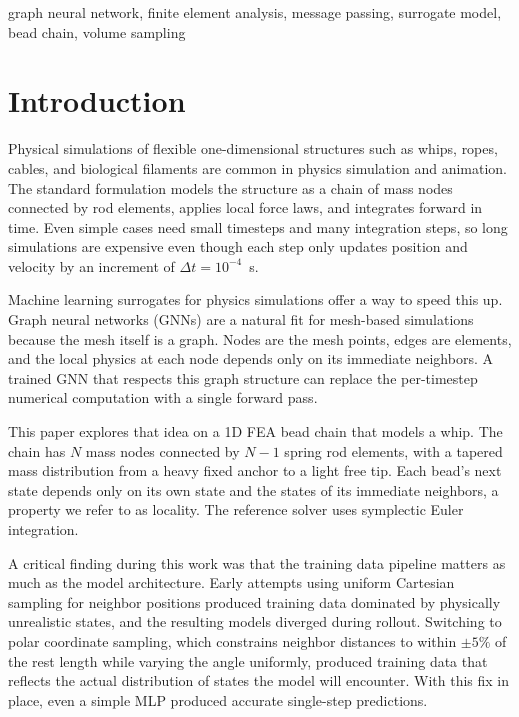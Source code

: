 \documentclass[conference]{IEEEtran}
\begin{document}
\begin{IEEEkeywords}
graph neural network, finite element analysis, message passing, surrogate model, bead chain, volume sampling
\end{IEEEkeywords}

\section{Introduction}

Physical simulations of flexible one-dimensional structures such as whips, ropes, cables, and biological filaments are common in physics simulation and animation. The standard formulation models the structure as a chain of mass nodes connected by rod elements, applies local force laws, and integrates forward in time. Even simple cases need small timesteps and many integration steps, so long simulations are expensive even though each step only updates position and velocity by an increment of $\Delta t = 10^{-4}$~s.

Machine learning surrogates for physics simulations offer a way to speed this up. Graph neural networks (GNNs) are a natural fit for mesh-based simulations because the mesh itself is a graph. Nodes are the mesh points, edges are elements, and the local physics at each node depends only on its immediate neighbors. A trained GNN that respects this graph structure can replace the per-timestep numerical computation with a single forward pass.

This paper explores that idea on a 1D FEA bead chain that models a whip. The chain has $N$ mass nodes connected by $N-1$ spring rod elements, with a tapered mass distribution from a heavy fixed anchor to a light free tip. Each bead's next state depends only on its own state and the states of its immediate neighbors, a property we refer to as locality. The reference solver uses symplectic Euler integration.

A critical finding during this work was that the training data pipeline matters as much as the model architecture. Early attempts using uniform Cartesian sampling for neighbor positions produced training data dominated by physically unrealistic states, and the resulting models diverged during rollout. Switching to polar coordinate sampling, which constrains neighbor distances to within $\pm 5\%$ of the rest length while varying the angle uniformly, produced training data that reflects the actual distribution of states the model will encounter. With this fix in place, even a simple MLP produced accurate single-step predictions.
\end{document}
